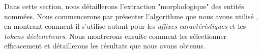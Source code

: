 \documentclass[PhD-Yoann-Dupont.tex]{subfiles}
\begin{document}
\begin{comment}
Parler article EGC \citep{dupont2016extraction} :
\begin{itemize}
    \item extraction de sous-séquences
    \item attribution de score
    \item classement dans un trellis
    \item insertion dans CRF
    \item comparer avec les String Kernel.
    \item comparer avec char\_LSTM-LSTM-CRF \cite{lample2016neural}
    \item faire char\_CNN-LSTM-CRF à partir de \cite{lample2016neural} ? Requiert de changer du code
\end{itemize}
\end{comment}

Dans cette section, nous détaillerons l'extraction "morphologique" des entités nommées. Nous commencerons par présenter l'algorithme que nous avons utilisé , en montrant comment il s'utilise autant pour les \emph{affixes caractéristiques} et les \emph{tokens déclencheurs}. Nous montrerons ensuite comment les sélectionner efficacement et détaillerons les résultats que nous avons obtenus.
\end{document}
